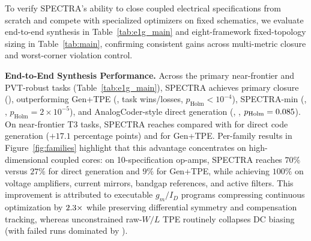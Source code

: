 

To verify \textsc{SPECTRA}'s ability to close coupled electrical specifications from scratch and compete with specialized optimizers on fixed schematics, we evaluate end-to-end synthesis in Table~\ref{tab:e1g_main} and eight-framework fixed-topology sizing in Table~\ref{tab:main}, confirming consistent gains across multi-metric closure and worst-corner violation control.

\textbf{End-to-End Synthesis Performance.} Across the \NPrimaryTasks{} primary near-frontier and PVT-robust tasks (Table~\ref{tab:e1g_main}), \textsc{SPECTRA} achieves \SpectraPrim{} primary closure (\SpectraPrimCI{}), outperforming Gen+TPE (\GenboPrim{}, \PrimGenboWL{} task wins/losses, $p_{\text{Holm}} < 10^{-4}$), SPECTRA-min (\SpectraMinPrim{}, \PrimSpectraMinWL{}, $p_{\text{Holm}} = 2\times 10^{-5}$), and AnalogCoder-style direct generation (\DirectPrim{}, \PrimDirectWL{}, $p_{\text{Holm}}=0.085{}$). On near-frontier T3 tasks, \textsc{SPECTRA} reaches \SpectraTThree{} compared with \DirectTThree{} for direct code generation ($+17.1$ percentage points) and \GenboTThree{} for Gen+TPE. Per-family results in Figure~\ref{fig:families} highlight that this advantage concentrates on high-dimensional coupled cores: on 10-specification op-amps, \textsc{SPECTRA} reaches $70\%$ versus $27\%$ for direct generation and $9\%$ for Gen+TPE, while achieving $100\%$ on voltage amplifiers, current mirrors, bandgap references, and active filters. This improvement is attributed to executable $g_m/I_D$ programs compressing continuous optimization by $2.3{}\times$ while preserving differential symmetry and compensation tracking, whereas unconstrained raw-$W/L$ TPE routinely collapses DC biasing (with failed runs dominated by \FailGenboTop{}).

